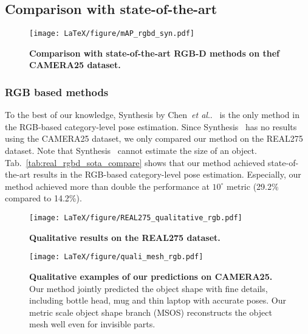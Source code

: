 \documentclass[letterpaper, 10 pt, journal, twoside]{IEEEtran}
\makeatletter
\DeclareRobustCommand\onedot{\futurelet\@let@token\@onedot}
\def\@onedot{\ifx\@let@token.\else.\null\fi\xspace}
\def\etal{\emph{et al}\onedot}
\newcommand{\CH}[1]{{#1}}
\newcommand{\tabref}[1]{Tab.~\ref{#1}}
\makeatother
\begin{document}
\subsection{Comparison with state-of-the-art}
\label{subsec:sota_comparison}

\begin{figure}
\begin{center}
\texttt{[image: LaTeX/figure/mAP\_rgbd\_syn.pdf]} \\
\caption{\textbf{Comparison with state-of-the-art RGB-D methods on thef CAMERA25 dataset.}}\label{fig:syn_sota_rgbd_fig}
\end{center}
\vspace{-5mm}
\end{figure}


\subsubsection{RGB based methods}
\label{subsec:sota_comparison_rgb}
To the best of our knowledge, Synthesis by Chen~\etal~\cite{chen2020Synthesis} is the only method in the RGB-based category-level pose estimation.
Since Synthesis~\cite{chen2020Synthesis} has no results using the CAMERA25 dataset, we only compared our method on the REAL275 dataset.
Note that Synthesis~\cite{chen2020Synthesis} cannot estimate the size of an object. 
\tabref{tab:real_rgbd_sota_compare} shows that our method achieved state-of-the-art results in the RGB-based category-level pose estimation.
Especially, our method achieved more than double the performance at $10^{\circ}$ metric (29.2\% compared to 14.2\%).



\begin{figure*}
\begin{center}
\texttt{[image: LaTeX/figure/REAL275\_qualitative\_rgb.pdf]} \\
\caption{\CH{\textbf{Qualitative results on the REAL275 dataset.}}}\label{fig:REAL275_qualitative}
\end{center}
\vspace{-5mm}
\end{figure*}

\begin{figure}
\begin{center}
\texttt{[image: LaTeX/figure/quali\_mesh\_rgb.pdf]} \\
\caption{\textbf{Qualitative examples of our predictions on CAMERA25.} 
 Our method jointly predicted the object shape with fine details, including bottle head, mug and thin laptop with accurate poses.
 Our metric scale object shape branch (MSOS) reconstructs the object mesh well even for invisible parts.
} 
\label{fig:qualitative}
\end{center}
\vspace{-5mm}
\end{figure}
\end{document}
